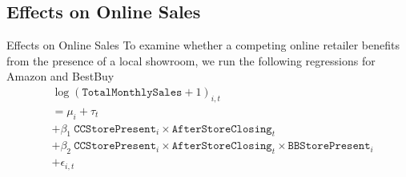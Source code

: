 \documentclass[mathserif, xcolor=table]{beamer}
\begin{document}
\subsection{Effects on Online Sales}
\begin{frame}[allowframebreaks]{Effects on Online Sales}
	To examine whether a competing online retailer benefits from the presence of a local showroom, we run the following regressions for Amazon and BestBuy
	\begin{equation}
		\begin{aligned}
			& \log\left( \texttt{TotalMonthlySales} + 1\right)_{i,t} \\ &= \mu_{i} + \tau_{t} 
			\\ &+ \beta_1 \ \texttt{CCStorePresent}_i \times \texttt{AfterStoreClosing}_t 
			\\ &+ \beta_2 \ \texttt{CCStorePresent}_i \times \texttt{AfterStoreClosing}_t \times \texttt{BBStorePresent}_i \\ & + \epsilon_{i,t}
		\end{aligned}
	\end{equation}
	\framebreak
	\begin{table}[!h] \centering 
		\caption{Results of the Sales Effect (All Product Categories)} 
		\label{tab:table4} 
\end{table}
\end{frame}
\end{document}
